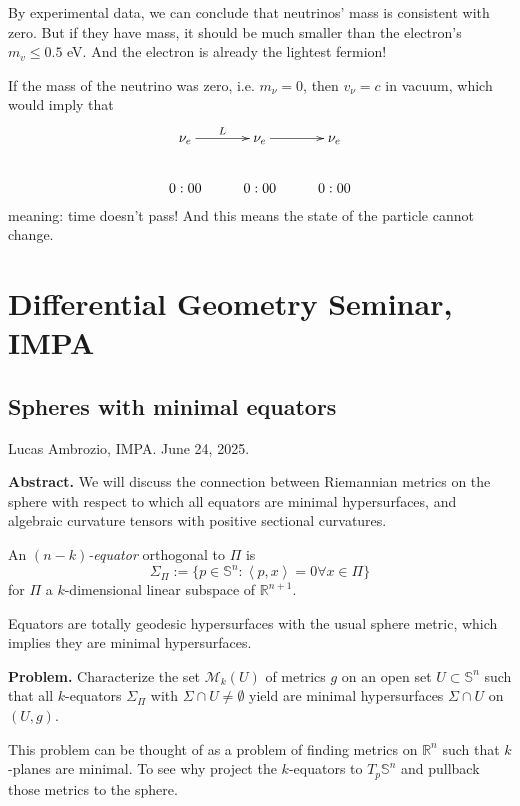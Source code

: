 By experimental data, we can conclude that neutrinos' mass is consistent with
zero. But if they have mass, it should be much smaller than the electron's $m_v
\leq 0.5$ eV. And the electron is already the lightest fermion!

If the mass of the neutrino was zero, i.e. $m_\nu=0$, then $v_\nu=c$ in vacuum,
which would imply that 
$$
\xymatrix{
\nu_e\ar[r]^{L}&\nu_e\ar[r]&\nu_e\\
0:00&0:00&0:00
}
$$
meaning: time doesn't pass! And this means the state of the particle cannot
change.

\section{Differential Geometry Seminar, IMPA}
\label{section-differential-geometry-seminar-impa}

\subsection{Spheres with minimal equators}
\label{subsection-spheres-with-minimal-equators}

\noindent\bigskip
Lucas Ambrozio, IMPA. June 24, 2025.

{\bf Abstract.} We will discuss the connection between Riemannian metrics on the
sphere with respect to which all equators are minimal hypersurfaces, and
algebraic curvature tensors with positive sectional curvatures.

\bigskip\noindent

\begin{definition}
\label{definition-equator}
An {\it $(n-k)$-equator} orthogonal to $\Pi$ is
$$
\Sigma_\Pi:=\{p\in\mathbb{S}^n:\left<p,x\right>=0\forall x\in\Pi\}
$$
for $\Pi$ a $k$-dimensional linear subspace of $\mathbb{R}^{n+1}$.
\end{definition}

\begin{remark}
\label{remark-equators-are-totally-geodesic-with-usual-metric}
Equators are totally geodesic hypersurfaces with the usual sphere metric, which
implies they are minimal hypersurfaces.
\end{remark}

{\bf Problem.} Characterize the set $\mathcal{M}_k(U)$ of metrics $g$ on an 
open set $U\subset\mathbb{S}^n$ such that all $k$-equators $\Sigma_\Pi$ with
 $\Sigma\cap U\neq\emptyset$ yield are minimal hypersurfaces $\Sigma\cap U$ 
on $(U,g)$.

\begin{remark}
\label{remark-why-not-Rn}
This problem can be thought of as a problem of finding metrics on $\mathbb{R}^n$
such that $k$-planes are minimal. To see why project the $k$-equators to
$T_p\mathbb{S}^n$ and pullback those metrics to the sphere.
\end{remark}

